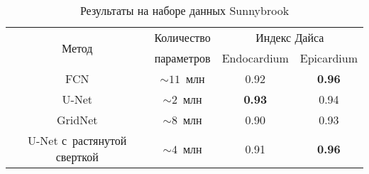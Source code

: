\begin{table}[h]
\begin{center}
    \caption{Результаты на наборе данных Sunnybrook} \label{tab:sunnybrook_results}
    \begin{tabular}{ |c||*{3}{c|} }
      \hline
      \multirow{2}{*}{Метод}      & Количество   & \multicolumn{2}{c|}{Индекс Дайса} \\ \cline{3-4}
                                  & параметров   & Endocardium   & Epicardium        \\ \hline
      \hline
      FCN                         & $\sim11$~млн & 0.92          & \textbf{0.96}     \\ \hline
      U-Net                       &  $\sim2$~млн & \textbf{0.93} & 0.94              \\ \hline
      GridNet                     &  $\sim8$~млн & 0.90          & 0.93              \\ \hline
      U-Net с~растянутой сверткой &  $\sim4$~млн & 0.91          & \textbf{0.96}     \\ 
      \hline
    \end{tabular}
  \end{center}
\end{table}
